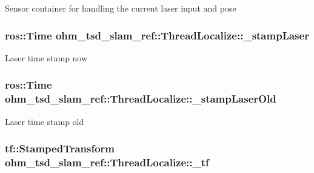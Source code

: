 Sensor container for handling the current laser input and pose \hypertarget{classohm__tsd__slam__ref_1_1ThreadLocalize_acf1975963191b84dd1fda914a4cc15ae}{
\subsubsection[{\-\_\-stamp\-Laser}]{\setlength{\rightskip}{0pt plus 5cm}ros\-::\-Time ohm\-\_\-tsd\-\_\-slam\-\_\-ref\-::\-Thread\-Localize\-::\-\_\-stamp\-Laser\hspace{0.3cm}{\ttfamily [private]}}}\label{classohm__tsd__slam__ref_1_1ThreadLocalize_acf1975963191b84dd1fda914a4cc15ae}
Laser time stamp now \hypertarget{classohm__tsd__slam__ref_1_1ThreadLocalize_a3993fb6424dd9af667ddf0b14cdf2fe4}{
\subsubsection[{\-\_\-stamp\-Laser\-Old}]{\setlength{\rightskip}{0pt plus 5cm}ros\-::\-Time ohm\-\_\-tsd\-\_\-slam\-\_\-ref\-::\-Thread\-Localize\-::\-\_\-stamp\-Laser\-Old\hspace{0.3cm}{\ttfamily [private]}}}\label{classohm__tsd__slam__ref_1_1ThreadLocalize_a3993fb6424dd9af667ddf0b14cdf2fe4}
Laser time stamp old \hypertarget{classohm__tsd__slam__ref_1_1ThreadLocalize_a58c3e63ca51b4f667361138ca9612a43}{
\subsubsection[{\-\_\-tf}]{\setlength{\rightskip}{0pt plus 5cm}tf\-::\-Stamped\-Transform ohm\-\_\-tsd\-\_\-slam\-\_\-ref\-::\-Thread\-Localize\-::\-\_\-tf\hspace{0.3cm}{\ttfamily [private]}}}\label{classohm__tsd__slam__ref_1_1ThreadLocalize_a58c3e63ca51b4f667361138ca9612a43}

